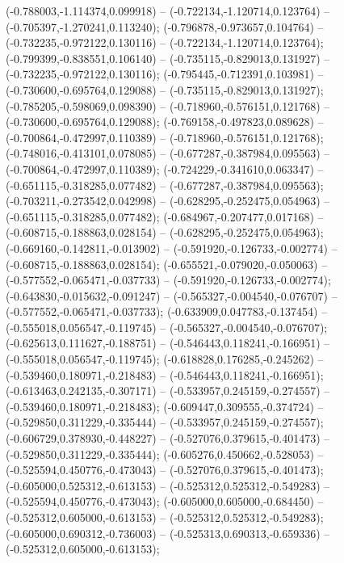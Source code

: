  (-0.788003,-1.114374,0.099918) -- (-0.722134,-1.120714,0.123764) -- (-0.705397,-1.270241,0.113240);
 (-0.796878,-0.973657,0.104764) -- (-0.732235,-0.972122,0.130116) -- (-0.722134,-1.120714,0.123764);
 (-0.799399,-0.838551,0.106140) -- (-0.735115,-0.829013,0.131927) -- (-0.732235,-0.972122,0.130116);
 (-0.795445,-0.712391,0.103981) -- (-0.730600,-0.695764,0.129088) -- (-0.735115,-0.829013,0.131927);
 (-0.785205,-0.598069,0.098390) -- (-0.718960,-0.576151,0.121768) -- (-0.730600,-0.695764,0.129088);
 (-0.769158,-0.497823,0.089628) -- (-0.700864,-0.472997,0.110389) -- (-0.718960,-0.576151,0.121768);
 (-0.748016,-0.413101,0.078085) -- (-0.677287,-0.387984,0.095563) -- (-0.700864,-0.472997,0.110389);
 (-0.724229,-0.341610,0.063347) -- (-0.651115,-0.318285,0.077482) -- (-0.677287,-0.387984,0.095563);
 (-0.703211,-0.273542,0.042998) -- (-0.628295,-0.252475,0.054963) -- (-0.651115,-0.318285,0.077482);
 (-0.684967,-0.207477,0.017168) -- (-0.608715,-0.188863,0.028154) -- (-0.628295,-0.252475,0.054963);
 (-0.669160,-0.142811,-0.013902) -- (-0.591920,-0.126733,-0.002774) -- (-0.608715,-0.188863,0.028154);
 (-0.655521,-0.079020,-0.050063) -- (-0.577552,-0.065471,-0.037733) -- (-0.591920,-0.126733,-0.002774);
 (-0.643830,-0.015632,-0.091247) -- (-0.565327,-0.004540,-0.076707) -- (-0.577552,-0.065471,-0.037733);
 (-0.633909,0.047783,-0.137454) -- (-0.555018,0.056547,-0.119745) -- (-0.565327,-0.004540,-0.076707);
 (-0.625613,0.111627,-0.188751) -- (-0.546443,0.118241,-0.166951) -- (-0.555018,0.056547,-0.119745);
 (-0.618828,0.176285,-0.245262) -- (-0.539460,0.180971,-0.218483) -- (-0.546443,0.118241,-0.166951);
 (-0.613463,0.242135,-0.307171) -- (-0.533957,0.245159,-0.274557) -- (-0.539460,0.180971,-0.218483);
 (-0.609447,0.309555,-0.374724) -- (-0.529850,0.311229,-0.335444) -- (-0.533957,0.245159,-0.274557);
 (-0.606729,0.378930,-0.448227) -- (-0.527076,0.379615,-0.401473) -- (-0.529850,0.311229,-0.335444);
 (-0.605276,0.450662,-0.528053) -- (-0.525594,0.450776,-0.473043) -- (-0.527076,0.379615,-0.401473);
 (-0.605000,0.525312,-0.613153) -- (-0.525312,0.525312,-0.549283) -- (-0.525594,0.450776,-0.473043);
 (-0.605000,0.605000,-0.684450) -- (-0.525312,0.605000,-0.613153) -- (-0.525312,0.525312,-0.549283);
 (-0.605000,0.690312,-0.736003) -- (-0.525313,0.690313,-0.659336) -- (-0.525312,0.605000,-0.613153);

